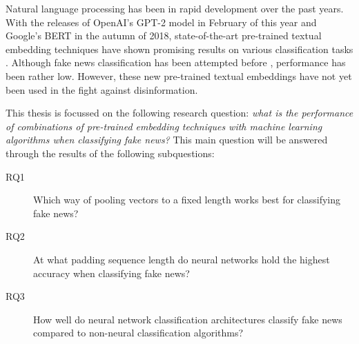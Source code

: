 Natural language processing has been in rapid development over the past years. 
With the releases of OpenAI's GPT-2 model in February of this year and Google's BERT in the autumn of 2018, state-of-the-art pre-trained textual embedding techniques have shown promising results on various classification tasks \cite{radford2019}\cite{devlin2018}. 
Although fake news classification has been attempted before \cite{wang2018}\cite{khurana2017}, performance has been rather low. However, these new pre-trained textual embeddings have not yet been used in the fight against disinformation. 

This thesis is focussed on the following research question: \textit{what is the performance of combinations of pre-trained embedding techniques with machine learning algorithms when classifying fake news?}
This main question will be answered through the results of the following subquestions:

\begin{description}
\item[RQ1] Which way of pooling vectors to a fixed length works best for classifying fake news?
\item[RQ2] At what padding sequence length do neural networks hold the highest accuracy when classifying fake news?
\item[RQ3] How well do neural network classification architectures classify fake news compared to non-neural classification algorithms?
\end{description}


